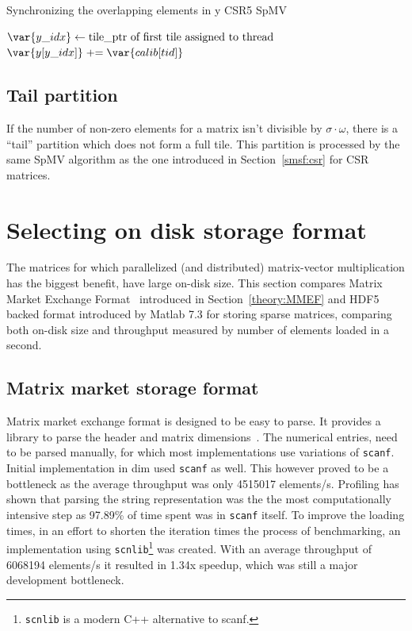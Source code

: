 \documentclass[thesis=M,english]{FITthesis}[2019/12/23]
\newcommand{\pluseq}{\mathrel{+}=}
\begin{document}
\begin{algorithm}
    \caption{Synchronizing the overlapping elements in y CSR5 SpMV}
    \begin{algorithmic}

        \State $\var{y\_idx} \gets \text{tile\_ptr of first tile assigned to thread}$
        \State $\var{y[y\_idx]} \pluseq \var{calib[tid]}$
        \EndFor
        \EndFunction
    \end{algorithmic}
\end{algorithm}

\subsection{Tail partition}

If the number of non-zero elements for a matrix isn't divisible by \(\sigma{} \cdot \omega{}\), there
is a ``tail'' partition which does not form a full tile. This partition is processed by the same SpMV
algorithm as the one introduced in Section~\ref{smsf:csr} for CSR matrices.

\section{Selecting on disk storage format}\label{impl:matlabComp}

The matrices for which parallelized (and distributed) matrix-vector multiplication has the biggest benefit,
have large on-disk size. This section compares Matrix Market Exchange Format~\cite{mmef} introduced in
Section~\ref{theory:MMEF} and HDF5 backed format
introduced by Matlab 7.3 for storing sparse matrices, comparing both on-disk size and throughput
measured by number of elements loaded in a second.

\subsection{Matrix market storage format}

Matrix market exchange format is designed to be easy to parse. It provides a library to parse
the header and matrix dimensions~\cite{mmC}.
The numerical entries, need to be parsed manually, for which most implemen\-tations use variations of \texttt{scanf}.
Initial implementation in dim used \texttt{scanf} as well. This however proved to be a bottleneck as
the average throughput was only \num{4515017} elements/s. Profiling has shown that parsing the string representation
was the the most computationally intensive step as 97.89\% of time spent was in \texttt{scanf} itself.
To improve the loading times, in an effort to
shorten the iteration times the process of benchmarking, an implementation using
\texttt{scnlib}\footnote{\texttt{scnlib} is a modern C++ alternative to scanf.}
was created. With an average throughput of \num{6068194} elements/s it resulted in 1.34x speedup, which was
still a major development bottleneck.
\end{document}

